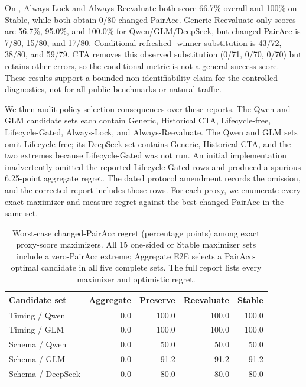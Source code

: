 \documentclass[10pt]{article}
\begin{document}
On \NewSchemaReplication{}, Always-Lock and Always-Reevaluate both score 66.7\% overall and 100\% on Stable, while
both obtain 0/80 changed PairAcc. Generic Reevaluate-only scores are 56.7\%, 95.0\%, and 100.0\%
for Qwen/GLM/DeepSeek, but changed PairAcc is 7/80, 15/80, and 17/80. Conditional refreshed-
winner substitution is 43/72, 38/80, and 59/79. CTA removes this observed substitution (0/71, 0/70, 0/70)
but retains other errors, so the conditional metric is not a general success score. These results
support a bounded non-identifiability claim for the controlled diagnostics, not for all public
benchmarks or natural traffic.

We then audit policy-selection consequences over these reports. The \PrimaryDiagnostic{} Qwen and GLM candidate
sets each contain Generic, Historical CTA, Lifecycle-free, Lifecycle-Gated, Always-Lock, and
Always-Reevaluate. The \NewSchemaReplication{} Qwen and GLM sets omit Lifecycle-free; its DeepSeek set contains
Generic, Historical CTA, and the two extremes because Lifecycle-Gated was not run. An initial
implementation inadvertently omitted the reported Lifecycle-Gated rows and produced a spurious
6.25-point aggregate regret. The dated protocol amendment records the omission, and the corrected
report includes those rows. For each proxy, we enumerate every exact maximizer and measure regret
against the best changed PairAcc in the same set.

\begin{table}[h]
\centering
\small
\begin{tabular}{lrrrr}
\toprule
Candidate set & Aggregate & Preserve & Reevaluate & Stable \\
\midrule
Timing / Qwen & 0.0 & 100.0 & 100.0 & 100.0 \\
Timing / GLM & 0.0 & 100.0 & 100.0 & 100.0 \\
Schema / Qwen & 0.0 & 50.0 & 50.0 & 50.0 \\
Schema / GLM & 0.0 & 91.2 & 91.2 & 91.2 \\
Schema / DeepSeek & 0.0 & 80.0 & 80.0 & 80.0 \\
\bottomrule
\end{tabular}
\caption{Worst-case changed-PairAcc regret (percentage points) among exact proxy-score
maximizers. All 15 one-sided or Stable maximizer sets include a zero-PairAcc extreme; Aggregate
E2E selects a PairAcc-optimal candidate in all five complete sets. The full report lists every
maximizer and optimistic regret.}
\label{tab:supp-selection-regret}
\end{table}
\end{document}
